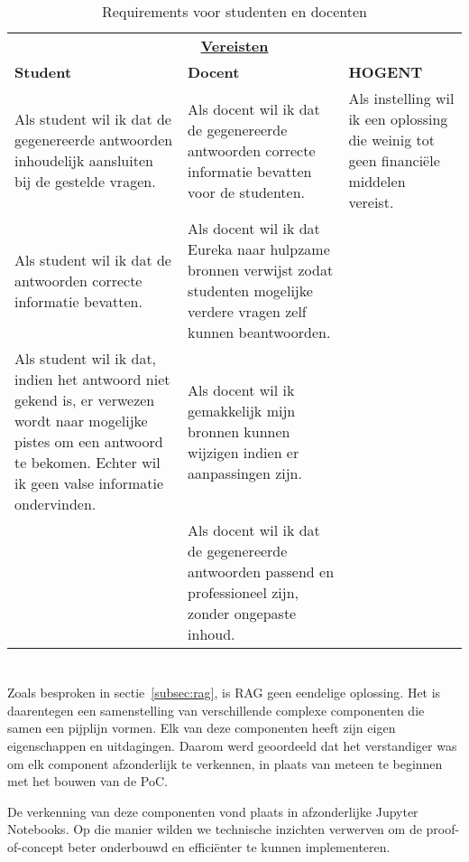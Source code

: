 \begin{table}[ht]
    \small 
    \centering
    \begin{tabular}{p{5cm} p{5cm} p{5cm}}
        \multicolumn{3}{c}{\uline{\textbf{Vereisten}}} \\
        \addlinespace[0.5ex]
        \textbf{Student} & \textbf{Docent} & \textbf{HOGENT}\\
        \midrule
        Als student wil ik dat de gegenereerde antwoorden inhoudelijk aansluiten bij de gestelde vragen. &
        Als docent wil ik dat de gegenereerde antwoorden correcte informatie bevatten voor de studenten. &
        Als instelling wil ik een oplossing die weinig tot geen financiële middelen vereist. \\
        Als student wil ik dat de antwoorden correcte informatie bevatten. &
        Als docent wil ik dat Eureka naar hulpzame bronnen verwijst zodat studenten mogelijke verdere vragen zelf kunnen beantwoorden. &\\
        Als student wil ik dat, indien het antwoord niet gekend is, er verwezen wordt naar mogelijke pistes om een antwoord te bekomen. Echter wil ik geen valse informatie ondervinden. &
        Als docent wil ik gemakkelijk mijn bronnen kunnen wijzigen indien er aanpassingen zijn. &\\
        & Als docent wil ik dat de gegenereerde antwoorden passend en professioneel zijn, zonder ongepaste inhoud. &\\
        \bottomrule
    \end{tabular}
    \caption{Requirements voor studenten en docenten}
    \label{tab:requirements}
\end{table}

\section{}%
\label{sec:technische-onderzoek}

Zoals besproken in sectie~\ref{subsec:rag}, is RAG geen eendelige oplossing. Het is daarentegen een samenstelling van verschillende complexe componenten die samen een pijplijn vormen. Elk van deze componenten heeft zijn eigen eigenschappen en uitdagingen. Daarom werd geoordeeld dat het verstandiger was om elk component afzonderlijk te verkennen, in plaats van meteen te beginnen met het bouwen van de PoC.

De verkenning van deze componenten vond plaats in afzonderlijke Jupyter Notebooks. Op die manier wilden we technische inzichten verwerven om de proof-of-concept beter onderbouwd en efficiënter te kunnen implementeren.

